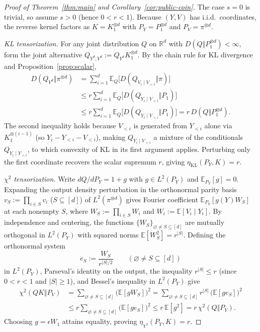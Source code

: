 \documentclass[11pt]{article}
\theoremstyle{plain}
\theoremstyle{definition}
\theoremstyle{remark}
\begin{document}
\begin{proof}[Proof of Theorem~\ref{thm:main} and Corollary~\ref{cor:public-coin}]
The case $s = 0$ is trivial, so assume $s > 0$ (hence $0 < r < 1$). Because $(Y, V)$ has i.i.d.\ coordinates, the reverse kernel factors as $K = K_1^{\otimes d}$ with $P_Y = P_1^{\otimes d}$ and $P_V = \pi^{\otimes d}$.

\emph{KL tensorization.} For any joint distribution $Q$ on $\mathbb{R}^d$ with $D(Q \Vert P_1^{\otimes d}) < \infty$, form the joint alternative $Q_{Y^d, V^d} := Q_{Y^d} K_1^{\otimes d}$. By the chain rule for KL divergence and Proposition~\ref{prop:scalar},
\begin{align*}
D(Q_{V^d} \Vert \pi^{\otimes d})
&= \sum_{i=1}^d \mathbb{E}_Q\bigl[D(Q_{V_i \mid V_{<i}} \Vert \pi)\bigr] \\
&\le r \sum_{i=1}^d \mathbb{E}_Q\bigl[D(Q_{Y_i \mid V_{<i}} \Vert P_1)\bigr] \\
&\le r \sum_{i=1}^d \mathbb{E}_Q\bigl[D(Q_{Y_i \mid Y_{<i}} \Vert P_1)\bigr]
= r\,D(Q \Vert P_1^{\otimes d}).
\end{align*}
The second inequality holds because $V_{<i}$ is generated from $Y_{<i}$ alone via $K_1^{\otimes(i-1)}$ (so $Y_i - Y_{<i} - V_{<i}$), making $Q_{Y_i \mid V_{<i}}$ a mixture of the conditionals $Q_{Y_i \mid Y_{<i}}$, to which convexity of KL in its first argument applies. Perturbing only the first coordinate recovers the scalar supremum $r$, giving $\eta_{\mathrm{KL}}(P_Y, K) = r$.

\emph{$\chi^2$ tensorization.} Write $dQ/dP_Y = 1 + g$ with $g \in L^2(P_Y)$ and $\mathbb{E}_{P_Y}[g] = 0$. Expanding the output density perturbation in the orthonormal parity basis $v_S := \prod_{i \in S} v_i$ ($S \subseteq [d]$) of $L^2(\pi^{\otimes d})$ gives Fourier coefficient $\mathbb{E}_{P_Y}[g(Y) W_S]$ at each nonempty $S$, where $W_S := \prod_{i \in S} W_i$ and $W_i := \mathbb{E}[V_i \mid Y_i]$. By independence and centering, the functions $\{W_S\}_{\varnothing \neq S \subseteq [d]}$ are mutually orthogonal in $L^2(P_Y)$ with squared norms $\mathbb{E}[W_S^2] = r^{|S|}$. Defining the orthonormal system
\[
e_S := \frac{W_S}{r^{|S|/2}} \qquad (\varnothing \neq S \subseteq [d])
\]
in $L^2(P_Y)$, Parseval's identity on the output, the inequality $r^{|S|} \le r$ (since $0 < r < 1$ and $|S| \ge 1$), and Bessel's inequality in $L^2(P_Y)$ give
\begin{align*}
\chi^2(QK \Vert P_V)
&= \sum_{\varnothing \neq S \subseteq [d]} \bigl(\mathbb{E}[g W_S]\bigr)^2
= \sum_{\varnothing \neq S \subseteq [d]} r^{|S|}\,\bigl(\mathbb{E}[g e_S]\bigr)^2 \\
&\le r \sum_{\varnothing \neq S \subseteq [d]} \bigl(\mathbb{E}[g e_S]\bigr)^2
\le r\,\mathbb{E}[g^2]
= r\,\chi^2(Q \Vert P_Y).
\end{align*}
Choosing $g = \epsilon W_1$ attains equality, proving $\eta_{\chi^2}(P_Y, K) = r$.


\end{proof}
\end{document}
